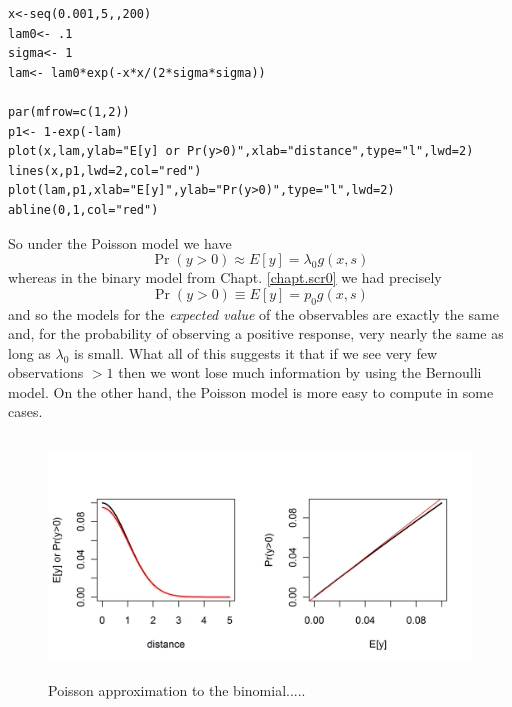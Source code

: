 {\small
\begin{verbatim}
x<-seq(0.001,5,,200)
lam0<- .1
sigma<- 1
lam<- lam0*exp(-x*x/(2*sigma*sigma))

par(mfrow=c(1,2))
p1<- 1-exp(-lam)
plot(x,lam,ylab="E[y] or Pr(y>0)",xlab="distance",type="l",lwd=2)
lines(x,p1,lwd=2,col="red")
plot(lam,p1,xlab="E[y]",ylab="Pr(y>0)",type="l",lwd=2)
abline(0,1,col="red")
\end{verbatim}
}


So under the Poisson model we have
\[
\Pr(y>0) \approx E[y] = \lambda_{0} g(x,s)
\]
whereas in the binary model from Chapt. \ref{chapt.scr0} we had
precisely 
\[
\Pr(y>0) \equiv E[y] = p_{0} g(x,s)
\]
and so the models for the {\it expected value} of the observables
are exactly the same and, for the probability of observing a positive
response, very nearly the same as 
long as $\lambda_{0}$ is small.
What all of this suggests it that
if we see very few observations $>1$ then we wont lose much
information by using the Bernoulli model. On the other hand, the
Poisson model is more easy to compute in some cases. 


\begin{figure}
\centering
\includegraphics[width=5in,height=2.5in]{Ch5/figs/Poisson-Bern.png}
\caption{Poisson approximation to the binomial.....}
\label{poisson-mn.fig.poissonbern}
\end{figure}


